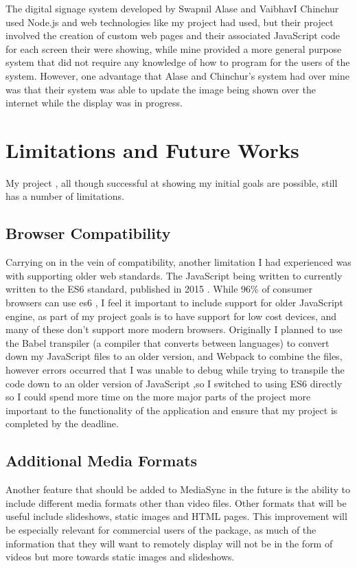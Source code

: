 \documentclass{article}
\begin{document}
The digital signage system developed by Swapnil Alase and VaibhavI Chinchur \cite{alase2017iot} used Node.js and web technologies like my project had used, but their project involved the creation of custom web pages and their associated JavaScript code for each screen their were showing, while mine provided a more general purpose system that did not require any knowledge of how to program for the users of the system. However, one advantage that Alase and Chinchur's system had over mine was that their system was able to update the image being shown over the internet while the display was in progress.  

\section{Limitations and Future Works}
My project , all though successful at showing my initial goals are possible, still has a number of limitations.



\subsection{Browser Compatibility}
Carrying on in the vein of compatibility, another limitation I had experienced was with supporting older web standards. The JavaScript being written to currently written to the ES6 standard, published in 2015 \cite{ecmascript}. While 96\% of consumer browsers can use es6 \cite{es6_support}, I feel it important to include support for older JavaScript engine, as part of my project goals is to have support for low cost devices, and many of these don't support more modern browsers. Originally I planned to use the Babel transpiler (a compiler that converts between languages) to convert down my JavaScript files to an older version, and Webpack to combine the files, however errors occurred that I was unable to debug while trying to transpile the code down to an older version of JavaScript ,so I switched to using ES6 directly so I could spend more time on the more major parts of the project more important to the functionality of the application and ensure that my project is completed by the deadline.

\subsection{Additional Media Formats}
Another feature that should be added to MediaSync in the future is the ability to include different media formats other than video files. Other formats that will be useful include slideshows, static images and HTML pages. This improvement will be especially relevant for commercial users of the package, as much of the information that they will want to remotely display will not be in the form of videos but more towards static images and slideshows.
\end{document}

